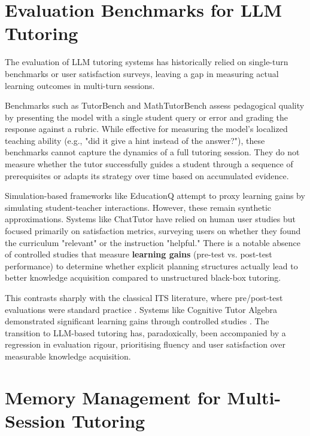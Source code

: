 \documentclass[logo,bsc,singlespacing,parskip,online]{infthesis}
\begin{document}
\section{Evaluation Benchmarks for LLM Tutoring}

The evaluation of LLM tutoring systems has historically relied on single-turn benchmarks or user satisfaction surveys, leaving a gap in measuring actual learning outcomes in multi-turn sessions.

Benchmarks such as TutorBench \citep{srinivasa2025tutorbench} and MathTutorBench \citep{macina2025mathtutorbench} assess pedagogical quality by presenting the model with a single student query or error and grading the response against a rubric. While effective for measuring the model's localized teaching ability (e.g., "did it give a hint instead of the answer?"), these benchmarks cannot capture the dynamics of a full tutoring session. They do not measure whether the tutor successfully guides a student through a sequence of prerequisites or adapts its strategy over time based on accumulated evidence.

Simulation-based frameworks like EducationQ \citep{shi2025educationq} attempt to proxy learning gains by simulating student-teacher interactions. However, these remain synthetic approximations. Systems like ChatTutor have relied on human user studies but focused primarily on satisfaction metrics, surveying users on whether they found the curriculum "relevant" or the instruction "helpful." There is a notable absence of controlled studies that measure \textbf{learning gains} (pre-test vs. post-test performance) to determine whether explicit planning structures actually lead to better knowledge acquisition compared to unstructured black-box tutoring.

This contrasts sharply with the classical ITS literature, where pre/post-test evaluations were standard practice \citep{kulik2016itsmeta}. Systems like Cognitive Tutor Algebra demonstrated significant learning gains through controlled studies \citep{koedinger1997intelligent}. The transition to LLM-based tutoring has, paradoxically, been accompanied by a regression in evaluation rigour, prioritising fluency and user satisfaction over measurable knowledge acquisition.

\section{Memory Management for Multi-Session Tutoring}
\end{document}
